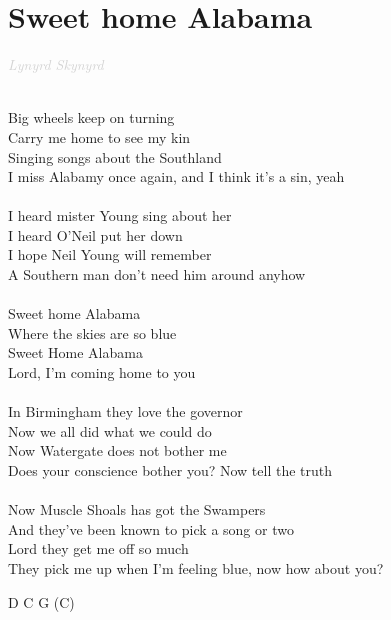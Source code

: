 \documentclass[a5paper, 10pt]{book}
\begin{document}
\newpage
\section{Sweet home Alabama}\textcolor{lightgray}{\textit{Lynyrd Skynyrd}}\\~\\
\begin{minipage}[t]{0.8\textwidth}
Big wheels keep on turning\\
Carry me home to see my kin\\
Singing songs about the Southland\\
I miss Alabamy once again, and I think it's a sin, yeah\\
\\
I heard mister Young sing about her\\
I heard O'Neil put her down\\
I hope Neil Young will remember\\
A Southern man don't need him around anyhow\\
\\
Sweet home Alabama\\
Where the skies are so blue\\
Sweet Home Alabama\\
Lord, I'm coming home to you\\
\\
In Birmingham they love the governor\\
Now we all did what we could do\\
Now Watergate does not bother me\\
Does your conscience bother you? Now tell the truth\\
\\
Now Muscle Shoals has got the Swampers\\
And they've been known to pick a song or two\\
Lord they get me off so much\\
They pick me up when I'm feeling blue, now how about you?\\
\end{minipage}
\begin{minipage}[t]{0.2\textwidth}
D C G (C)\\
\end{minipage}

\newpage
\end{document}
